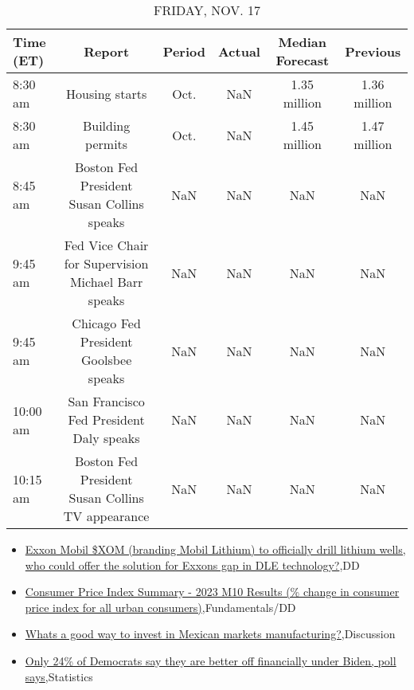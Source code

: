 \documentclass{article}%
\begin{document}
%


\begin{table}[htbp]%
\caption{FRIDAY, NOV. 17}%
\centering%
\begin{adjustbox}{width=1\textwidth}%
\begin{tabular}{lccccc}
\toprule
Time (ET) &                                             Report & Period & Actual & Median Forecast &     Previous \\
\midrule
  8:30 am &                                     Housing starts &   Oct. &    NaN &    1.35 million & 1.36 million \\
  8:30 am &                                   Building permits &   Oct. &    NaN &    1.45 million & 1.47 million \\
  8:45 am &          Boston Fed President Susan Collins speaks &    NaN &    NaN &             NaN &          NaN \\
  9:45 am & Fed Vice Chair for Supervision Michael Barr speaks &    NaN &    NaN &             NaN &          NaN \\
  9:45 am &              Chicago Fed President Goolsbee speaks &    NaN &    NaN &             NaN &          NaN \\
 10:00 am &            San Francisco Fed President Daly speaks &    NaN &    NaN &             NaN &          NaN \\
 10:15 am &   Boston Fed President Susan Collins TV appearance &    NaN &    NaN &             NaN &          NaN \\
\bottomrule
\end{tabular}
%
\end{adjustbox}%
\end{table}

%
\begin{itemize}%
\item%
\href{https://reddit.com/r/Baystreetbets/comments/17v7icd/exxon\_mobil\_xom\_branding\_mobil\_lithium\_to/}{Exxon Mobil \$XOM (branding Mobil Lithium) to officially drill lithium wells, who could offer the solution for Exxons gap in DLE technology?},DD%
\item%
\href{https://reddit.com/r/StockMarket/comments/17v8ebr/consumer\_price\_index\_summary\_2023\_m10\_results/}{Consumer Price Index Summary - 2023 M10 Results (\% change in consumer price index for all urban consumers)},Fundamentals/DD%
\item%
\href{https://reddit.com/r/StockMarket/comments/17v34p1/whats\_a\_good\_way\_to\_invest\_in\_mexican\_markets/}{Whats a good way to invest in Mexican markets manufacturing?},Discussion%
\item%
\href{https://reddit.com/r/Economics/comments/17vkeil/only\_24\_of\_democrats\_say\_they\_are\_better\_off/}{Only 24\% of Democrats say they are better off financially under Biden, poll says},Statistics%
\end{itemize}%
\end{document}
